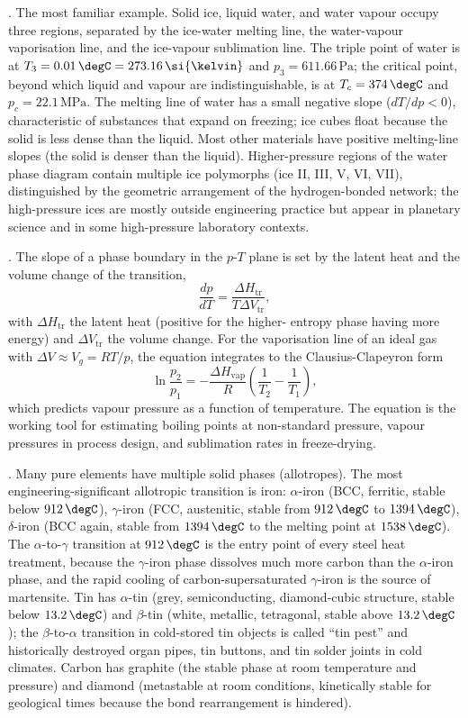. The most familiar example. Solid
ice, liquid water, and water vapour occupy three regions, separated by
the ice-water melting line, the water-vapour vaporisation line, and
the ice-vapour sublimation line. The triple point of water is at $T_3
= 0.01\,\degC = 273.16\,\si{\kelvin}$ and $p_3 = 611.66\,\text{Pa}$;
the critical point, beyond which liquid and vapour are
indistinguishable, is at $T_c = 374\,\degC$ and $p_c = 22.1\,\text{MPa}$.
The melting line of water has a small negative slope ($dT/dp < 0$),
characteristic of substances that expand on freezing; ice cubes float
because the solid is less dense than the liquid. Most other materials
have positive melting-line slopes (the solid is denser than the
liquid). Higher-pressure regions of the water phase diagram contain
multiple ice polymorphs (ice II, III, V, VI, VII), distinguished by
the geometric arrangement of the hydrogen-bonded network; the
high-pressure ices are mostly outside engineering practice but appear
in planetary science and in some high-pressure laboratory contexts.

. The slope of a phase
boundary in the $p$-$T$ plane is set by the latent heat and the
volume change of the transition,
\[
\frac{dp}{dT} = \frac{\Delta H_{\text{tr}}}{T \Delta V_{\text{tr}}},
\]
with $\Delta H_{\text{tr}}$ the latent heat (positive for the higher-
entropy phase having more energy) and $\Delta V_{\text{tr}}$ the
volume change. For the vaporisation line of an ideal gas with
$\Delta V \approx V_g = RT/p$, the equation integrates to the
Clausius-Clapeyron form
\[
\ln\frac{p_2}{p_1} = -\frac{\Delta H_{\text{vap}}}{R}\left(\frac{1}{T_2}
- \frac{1}{T_1}\right),
\]
which predicts vapour pressure as a function of temperature. The
equation is the working tool for estimating boiling points at
non-standard pressure, vapour pressures in process design, and
sublimation rates in freeze-drying.

. Many pure elements have
multiple solid phases (allotropes). The most engineering-significant
allotropic transition is iron: $\alpha$-iron (BCC, ferritic, stable
below $912\,\degC$), $\gamma$-iron (FCC, austenitic, stable from
$912\,\degC$ to $1394\,\degC$), $\delta$-iron (BCC again, stable from
$1394\,\degC$ to the melting point at $1538\,\degC$). The
$\alpha$-to-$\gamma$ transition at $912\,\degC$ is the entry point of
every steel heat treatment, because the $\gamma$-iron phase dissolves
much more carbon than the $\alpha$-iron phase, and the rapid cooling
of carbon-supersaturated $\gamma$-iron is the source of martensite.
Tin has $\alpha$-tin (grey, semiconducting, diamond-cubic structure,
stable below $13.2\,\degC$) and $\beta$-tin (white, metallic,
tetragonal, stable above $13.2\,\degC$); the $\beta$-to-$\alpha$
transition in cold-stored tin objects is called ``tin pest'' and
historically destroyed organ pipes, tin buttons, and tin solder joints
in cold climates. Carbon has graphite (the stable phase at room
temperature and pressure) and diamond (metastable at room conditions,
kinetically stable for geological times because the bond rearrangement
is hindered).

